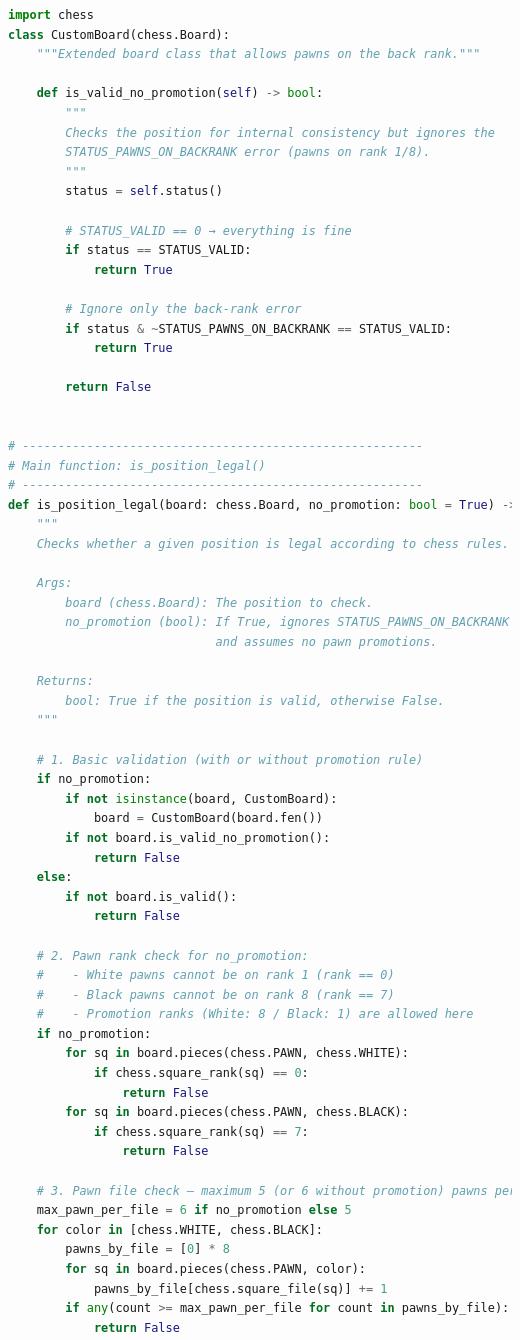 \documentclass[12pt]{article}
\begin{document}
\begin{lstlisting}[language=Python, caption={Validation of chess positions using python-chess}, label={lst:is_legal}]
import chess
class CustomBoard(chess.Board):
    """Extended board class that allows pawns on the back rank."""

    def is_valid_no_promotion(self) -> bool:
        """
        Checks the position for internal consistency but ignores the
        STATUS_PAWNS_ON_BACKRANK error (pawns on rank 1/8).
        """
        status = self.status()

        # STATUS_VALID == 0 → everything is fine
        if status == STATUS_VALID:
            return True

        # Ignore only the back-rank error
        if status & ~STATUS_PAWNS_ON_BACKRANK == STATUS_VALID:
            return True

        return False


# --------------------------------------------------------
# Main function: is_position_legal()
# --------------------------------------------------------
def is_position_legal(board: chess.Board, no_promotion: bool = True) -> bool:
    """
    Checks whether a given position is legal according to chess rules.

    Args:
        board (chess.Board): The position to check.
        no_promotion (bool): If True, ignores STATUS_PAWNS_ON_BACKRANK
                             and assumes no pawn promotions.

    Returns:
        bool: True if the position is valid, otherwise False.
    """

    # 1. Basic validation (with or without promotion rule)
    if no_promotion:
        if not isinstance(board, CustomBoard):
            board = CustomBoard(board.fen())
        if not board.is_valid_no_promotion():
            return False
    else:
        if not board.is_valid():
            return False

    # 2. Pawn rank check for no_promotion:
    #    - White pawns cannot be on rank 1 (rank == 0)
    #    - Black pawns cannot be on rank 8 (rank == 7)
    #    - Promotion ranks (White: 8 / Black: 1) are allowed here
    if no_promotion:
        for sq in board.pieces(chess.PAWN, chess.WHITE):
            if chess.square_rank(sq) == 0:
                return False
        for sq in board.pieces(chess.PAWN, chess.BLACK):
            if chess.square_rank(sq) == 7:
                return False
    
    # 3. Pawn file check – maximum 5 (or 6 without promotion) pawns per file
    max_pawn_per_file = 6 if no_promotion else 5
    for color in [chess.WHITE, chess.BLACK]:
        pawns_by_file = [0] * 8
        for sq in board.pieces(chess.PAWN, color):
            pawns_by_file[chess.square_file(sq)] += 1
        if any(count >= max_pawn_per_file for count in pawns_by_file):
            return False


\end{lstlisting}
\end{document}
